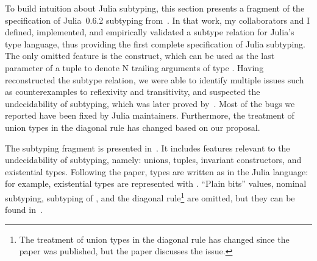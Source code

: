 To build intuition about Julia subtyping, this section presents a fragment
of the specification of
Julia~0.6.2 subtyping from~\cite{bib:zappa-nardelli:julia-sub:oopsla:2018}.
In that work, my collaborators and I defined, implemented, and empirically
validated a subtype relation for Julia's type language,
thus providing the first complete specification of Julia subtyping.
The only omitted feature is the
 construct, which can be used as the last
parameter of a tuple to denote N trailing arguments of type .
Having reconstructed the subtype relation,
we were able to identify multiple issues such as
counterexamples to reflexivity and transitivity,
and suspected the undecidability of subtyping,
which was later proved by~\citet{bib:chung:type-julia-thesis:2023}.
Most of the bugs we reported have been fixed by Julia maintainers.
Furthermore, the treatment of union types in the diagonal rule has changed
based on our proposal.

The subtyping fragment is presented in~. 
It includes features relevant to the undecidability of subtyping, namely:
unions, tuples, invariant constructors, and existential types.
Following the paper, types are written as in the Julia language:
for example, existential types are represented with .
``Plain bits'' values, nominal subtyping, 
subtyping of , and the diagonal
rule\footnote{The treatment of union types in the diagonal rule has changed
since the paper was published, but the paper discusses the issue.}
are omitted, but they can be found
in~\cite{bib:zappa-nardelli:julia-sub:oopsla:2018}.


